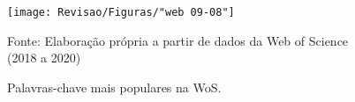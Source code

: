 \begin{figure}[H]
	\centering
	\caption{Palavras-chave mais populares na WoS.}
	\label{fig:web-09-08}
	\texttt{[image: Revisao/Figuras/"web 09-08"]}
	
	
	\vspace{0.2cm}
	Fonte: Elaboração própria a partir de dados da Web of Science (2018 a 2020)
\end{figure}